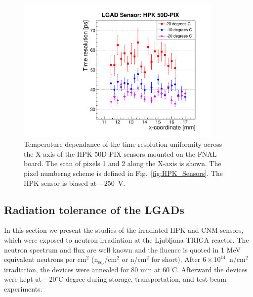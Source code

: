 \documentclass[preprint,1p]{elsarticle}
\begin{document}
\begin{figure}[htbp] 
\centering
\includegraphics[width=0.9\textwidth]{figs/FNAL_TimeResolution_vs_X_HPK50D_TemperatureDependance.pdf} 
\caption{Temperature dependance of the time resolution uniformity across the
X-axis of the HPK 50D-PIX sensors mounted on the FNAL board. The scan of pixels
1 and 2 along the X-axis is shown. The pixel numberng scheme is defined in
Fig.~\ref{fig:HPK_Sensors}. The HPK sensor is biased at $-250$~V.} 
\label{fig:TimeResolution_vs_X_HPK50D_TemperatureDependance} 
\end{figure} 




\subsection{Radiation tolerance of the LGADs}
\label{sec:rad_tolerance}

In this section we present the studies of the irradiated HPK and CNM sensors,
which were exposed to neutron irradiation at the Ljubljana TRIGA reactor. The
neutron spectrum and flux are well known and the fluence is quoted in 1 MeV
equivalent neutrons per cm$^2$ (n$_{\mathrm{eq.}}$/cm$^2$ or 
n/cm$^2$ for short). After $6\times 10^{14}$~n/cm$^2$ irradiation, the devices were
annealed for 80 min at $60^{\circ}$C. Afterward the devices were kept at
$-20^{\circ}$C degree during storage, transportation, and test beam experiments.
\end{document}
